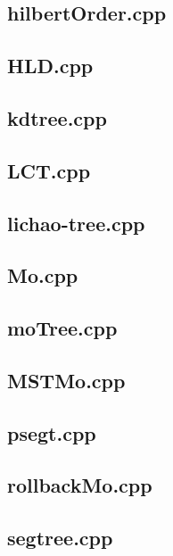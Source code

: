 \subsection{hilbertOrder.cpp}


\subsection{HLD.cpp}


\subsection{kdtree.cpp}


\subsection{LCT.cpp}


\subsection{lichao-tree.cpp}


\subsection{Mo.cpp}


\subsection{moTree.cpp}


\subsection{MSTMo.cpp}


\subsection{psegt.cpp}


\subsection{rollbackMo.cpp}


\subsection{segtree.cpp}


